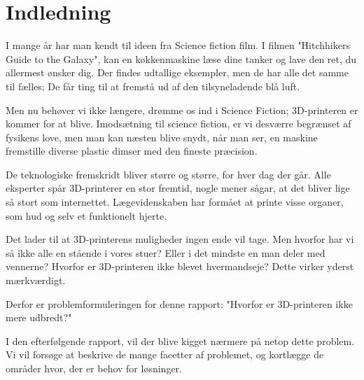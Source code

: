 \chapter{Indledning} %
\label{cha:Indledning}

I mange år har man kendt til ideen fra Science fiction film. I filmen "Hitchhikers Guide to the Galaxy", kan en køkkenmaskine læse dine tanker og lave den ret, du allermest ønsker dig. Der findes udtallige eksempler, men de har alle det samme til fælles; De får ting til at fremstå ud af den tilsyneladende blå luft.

Men nu behøver vi ikke længere, drømme os ind i Science Fiction; 3D-printeren er kommer for at blive. Imodsætning til science fiction, er vi desværre begrænset af fysikens love, men man kan næsten blive snydt, når man ser, en maskine fremstille diverse plastic dimser med den fineste præcision.

De teknologiske fremskridt bliver større og større, for hver dag der går. Alle eksperter spår 3D-printerer en stor fremtid, nogle mener sågar, at det bliver lige så stort som internettet. Lægevidenskaben har formået at printe visse organer, som hud og selv et funktionelt hjerte.

Det lader til at 3D-printerens muligheder ingen ende vil tage. Men hvorfor har vi så ikke alle en stående i vores stuer? Eller i det mindste en man deler med vennerne? Hvorfor er 3D-printeren ikke blevet hvermandseje? Dette virker yderst mærkværdigt. 

Derfor er problemformuleringen for denne rapport: "Hvorfor er 3D-printeren ikke mere udbredt?"

I den efterfølgende rapport, vil der blive kigget nærmere på netop dette problem. Vi vil forsøge at beskrive de mange facetter af problemet, og kortlægge de områder hvor, der er behov for løsninger.

